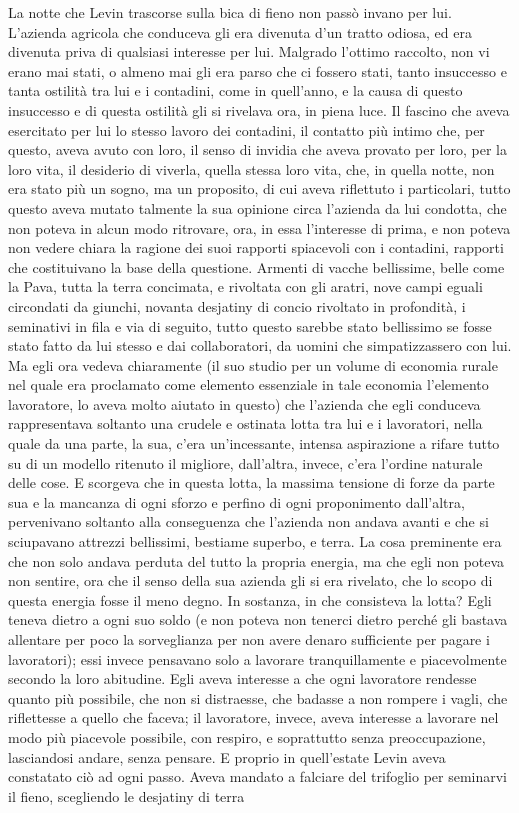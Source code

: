 La notte che Levin trascorse sulla bica di fieno non passò invano per lui. L'azienda agricola che conduceva gli era divenuta d'un tratto odiosa, ed era divenuta priva di qualsiasi interesse per lui. Malgrado l'ottimo raccolto, non vi erano mai stati, o almeno mai gli era parso che ci fossero stati, tanto insuccesso e tanta ostilità tra lui e i contadini, come in quell'anno, e la causa di questo insuccesso e di questa ostilità gli si rivelava ora, in piena luce. Il fascino che aveva esercitato per lui lo stesso lavoro dei contadini, il contatto più intimo che, per questo, aveva avuto con loro, il senso di invidia che aveva provato per loro, per la loro vita, il desiderio di viverla, quella stessa loro vita, che, in quella notte, non era stato più un sogno, ma un proposito, di cui aveva riflettuto i particolari, tutto questo aveva mutato talmente la sua opinione circa l'azienda da lui condotta, che non poteva in alcun modo ritrovare, ora, in essa l'interesse di prima, e non poteva non vedere chiara la ragione dei suoi rapporti spiacevoli con i contadini, rapporti che costituivano la base della questione. Armenti di vacche bellissime, belle come la Pava, tutta la terra concimata, e rivoltata con gli aratri, nove campi eguali circondati da giunchi, novanta desjatiny di concio rivoltato in profondità, i seminativi in fila e via di seguito, tutto questo sarebbe stato bellissimo se fosse stato fatto da lui stesso e dai collaboratori, da uomini che simpatizzassero con lui. Ma egli ora vedeva chiaramente (il suo studio per un volume di economia rurale nel quale era proclamato come elemento essenziale in tale economia l'elemento lavoratore, lo aveva molto aiutato in questo) che l'azienda che egli conduceva rappresentava soltanto una crudele e ostinata lotta tra lui e i lavoratori, nella quale da una parte, la sua, c'era un'incessante, intensa aspirazione a rifare tutto su di un modello ritenuto il migliore, dall'altra, invece, c'era l'ordine naturale delle cose. E scorgeva che in questa lotta, la massima tensione di forze da parte sua e la mancanza di ogni sforzo e perfino di ogni proponimento dall'altra, pervenivano soltanto alla conseguenza che l'azienda non andava avanti e che si sciupavano attrezzi bellissimi, bestiame superbo, e terra. La cosa preminente era che non solo andava perduta del tutto la propria energia, ma che egli non poteva non sentire, ora che il senso della sua azienda gli si era rivelato, che lo scopo di questa energia fosse il meno degno. In sostanza, in che consisteva la lotta? Egli teneva dietro a ogni suo soldo (e non poteva non tenerci dietro perché gli bastava allentare per poco la sorveglianza per non avere denaro sufficiente per pagare i lavoratori); essi invece pensavano solo a lavorare tranquillamente e piacevolmente secondo la loro abitudine. Egli aveva interesse a che ogni lavoratore rendesse quanto più possibile, che non si distraesse, che badasse a non rompere i vagli, che riflettesse a quello che faceva; il lavoratore, invece, aveva interesse a lavorare nel modo più piacevole possibile, con respiro, e soprattutto senza preoccupazione, lasciandosi andare, senza pensare. E proprio in quell'estate Levin aveva constatato ciò ad ogni passo. Aveva mandato a falciare del trifoglio per seminarvi il fieno, scegliendo le desjatiny di terra 